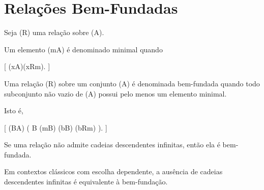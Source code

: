 \documentclass[../../main]{subfiles}
\begin{document}
\section{Relações Bem-Fundadas}
\label{sec:matematica:relacoes:relacoes-bem-fundadas}

\begin{defn}
	\label{def:matematica:relacoes:bem-fundadas:minimal}

	Seja (R) uma relação sobre (A).

	Um elemento (m\in A) é denominado minimal quando

		[
			\neg(\exists x\in A)(xRm).
		]

\end{defn}

\begin{defn}
	\label{def:matematica:relacoes:bem-fundadas}

	Uma relação (R) sobre um conjunto (A) é denominada bem-fundada
	quando todo subconjunto não vazio de (A) possui pelo menos um
	elemento minimal.

	Isto é,

	[
			(\forall B\subseteq A)
			\Bigl(
			B\neq\varnothing
			\Rightarrow
				(\exists m\in B)
				(\forall b\in B)
			\neg(bRm)
			\Bigr).
		]

\end{defn}

\begin{prop}
	\label{prop:matematica:relacoes:bem-fundada-sem-cadeias}

	Se uma relação não admite cadeias descendentes infinitas, então ela é
	bem-fundada.

\end{prop}

\begin{obs}

	Em contextos clássicos com escolha dependente, a ausência de cadeias
	descendentes infinitas é equivalente à bem-fundação.

\end{obs}




\end{document}
